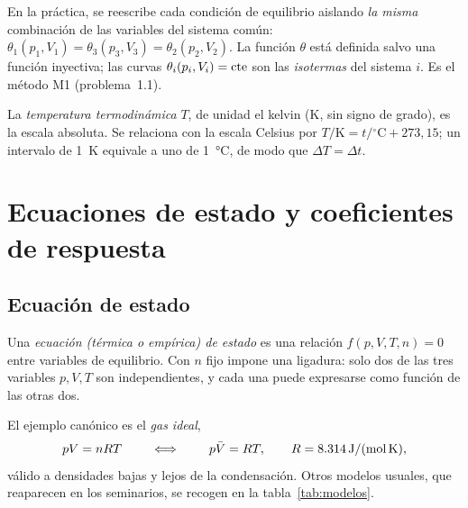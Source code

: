 \begin{observacion}
En la práctica, se reescribe cada condición de equilibrio aislando \emph{la misma} combinación de las
variables del sistema común: $\theta_1(p_1,V_1)=\theta_3(p_3,V_3)=\theta_2(p_2,V_2)$. La función $\theta$
está definida salvo una función inyectiva; las curvas $\theta_i(p_i,V_i)=\mathrm{cte}$ son las \emph{isotermas}
del sistema $i$. Es el método M1 (problema~1.1).
\end{observacion}

\begin{definicion}
La \emph{temperatura termodinámica} $T$, de unidad el kelvin (K, sin signo de grado), es la escala
absoluta. Se relaciona con la escala Celsius por $T/\mathrm{K}=t/{}^\circ\mathrm{C}+273{,}15$; un
intervalo de \SI{1}{K} equivale a uno de \SI{1}{\celsius}, de modo que $\Delta T=\Delta t$.
\end{definicion}

\section{Ecuaciones de estado y coeficientes de respuesta}
\subsection{Ecuación de estado}

\begin{definicion}
Una \emph{ecuación (térmica o empírica) de estado} es una relación $f(p,V,T,n)=0$ entre variables de
equilibrio. Con $n$ fijo impone una ligadura: solo dos de las tres variables $p,V,T$ son
independientes, y cada una puede expresarse como función de las otras dos.
\end{definicion}

El ejemplo canónico es el \emph{gas ideal},
\begin{equation}\label{eq:gasideal}
  pV=nRT\qquad\iff\qquad p\bar{V}=RT,\qquad R=\SI{8,314}{J/(mol.K)},
\end{equation}
válido a densidades bajas y lejos de la condensación. Otros modelos usuales, que reaparecen en los
seminarios, se recogen en la tabla~\ref{tab:modelos}.

